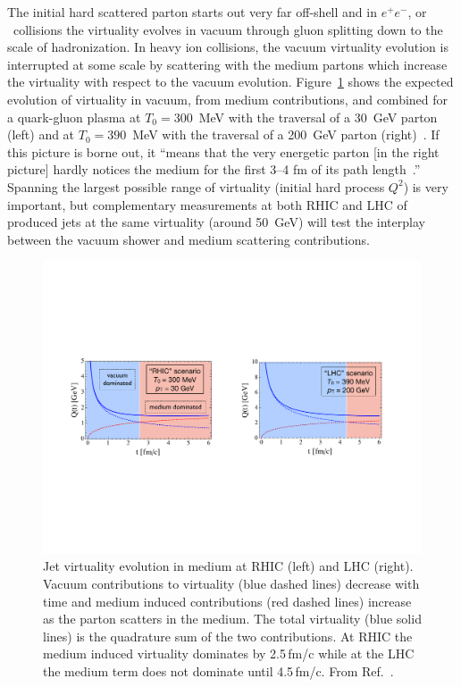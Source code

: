 The initial hard scattered parton starts out very far off-shell and in
$e^{+}e^{-}$, \pp or \ppbar~collisions the virtuality evolves in
vacuum through gluon splitting down to the scale of hadronization.  In
heavy ion collisions, the vacuum virtuality evolution is interrupted
at some scale by scattering with the medium partons which increase the
virtuality with respect to the vacuum evolution.
Figure~\ref{fig:virtualityevolution} shows the expected evolution of
virtuality in vacuum, from medium contributions, and combined for a
quark-gluon plasma at $T_0 = 300$~MeV with the traversal of a 30~GeV
parton (left) and at $T_{0}=390$~MeV with the traversal of a 200~GeV
parton (right)~\cite{Muller:usersmeeting,Muller:2010pm}.  If this
picture is borne out, it ``means that the very energetic parton [in
the right picture] hardly notices the medium for the first 3--4 fm of
its path length~\cite{Muller:2010pm}.'' Spanning the largest possible
range of virtuality (initial hard process $Q^{2}$) is very important,
but complementary measurements at both RHIC and LHC of produced jets
at the same virtuality (around 50~GeV) will test the interplay between
the vacuum shower and medium scattering contributions.

\begin{figure}[!hb]
 \begin{center}
    \includegraphics[trim = 2 2 2 2, clip, width=0.95\linewidth]{figs/figure_physicscase_virtualityevolution}
    \caption[Jet virtuality evolution in medium at RHIC and
    LHC]{\label{fig:virtualityevolution}Jet virtuality evolution in
      medium at RHIC (left) and LHC (right).  Vacuum contributions to
      virtuality (blue dashed lines) decrease with time and medium
      induced contributions (red dashed lines) increase as the parton
      scatters in the medium.  The total virtuality (blue solid lines)
      is the quadrature sum of the two contributions.  At RHIC the
      medium induced virtuality dominates by 2.5\,fm/c while at the
      LHC the medium term does not dominate until 4.5\,fm/c.  From
      Ref.~\protect\cite{Muller:usersmeeting}{}.}
 \end{center}
\end{figure}

